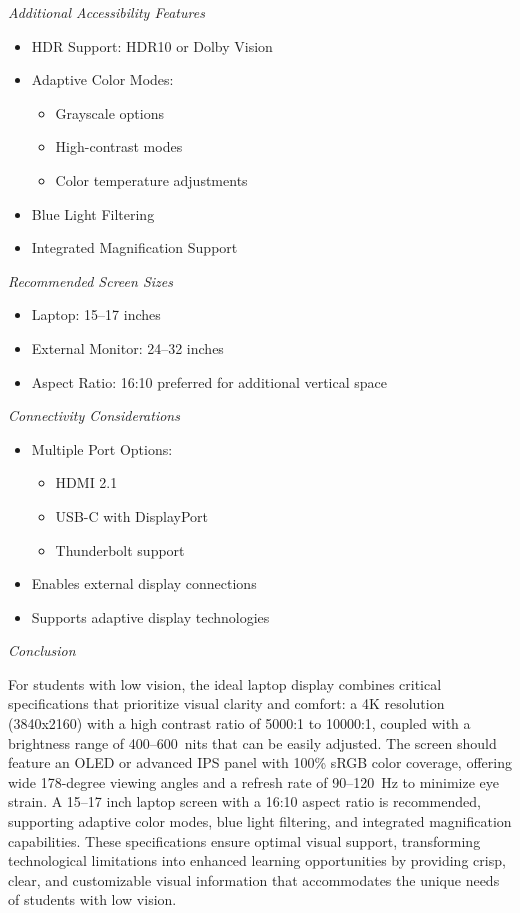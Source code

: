 \textit{Additional Accessibility Features}
\begin{itemize}
    \item HDR Support: HDR10 or Dolby Vision
    \item Adaptive Color Modes:
        \begin{itemize}
            \item Grayscale options
            \item High-contrast modes
            \item Color temperature adjustments
        \end{itemize}
    \item Blue Light Filtering
    \item Integrated Magnification Support
\end{itemize}

\textit{Recommended Screen Sizes}
\begin{itemize}
    \item Laptop: 15--17 inches
    \item External Monitor: 24--32 inches
    \item Aspect Ratio: 16:10 preferred for additional vertical space
\end{itemize}

\textit{Connectivity Considerations}
\begin{itemize}
    \item Multiple Port Options:
        \begin{itemize}
            \item HDMI 2.1
            \item USB-C with DisplayPort
            \item Thunderbolt support
        \end{itemize}
    \item Enables external display connections
    \item Supports adaptive display technologies
\end{itemize}

\emph{Conclusion}

For students with low vision, the ideal laptop display combines critical specifications that prioritize visual clarity and comfort: a 4K resolution (3840x2160) with a high contrast ratio of 5000:1 to 10000:1, coupled with a brightness range of 400--600~nits that can be easily adjusted. The screen should feature an OLED or advanced IPS panel with 100\% sRGB color coverage, offering wide 178-degree viewing angles and a refresh rate of 90--120~Hz to minimize eye strain. A 15--17 inch laptop screen with a 16:10 aspect ratio is recommended, supporting adaptive color modes, blue light filtering, and integrated magnification capabilities. These specifications ensure optimal visual support, transforming technological limitations into enhanced learning opportunities by providing crisp, clear, and customizable visual information that accommodates the unique needs of students with low vision.

